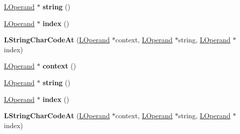 \begin{DoxyCompactItemize}
\item 
\hyperlink{classv8_1_1internal_1_1_l_operand}{L\+Operand} $\ast$ {\bfseries string} ()\hypertarget{classv8_1_1internal_1_1_l_string_char_code_at_a935ea67cb0997a56225d8943bd28acfc}{}\label{classv8_1_1internal_1_1_l_string_char_code_at_a935ea67cb0997a56225d8943bd28acfc}

\item 
\hyperlink{classv8_1_1internal_1_1_l_operand}{L\+Operand} $\ast$ {\bfseries index} ()\hypertarget{classv8_1_1internal_1_1_l_string_char_code_at_a6d34721abedba9af5cdca55a18b388c2}{}\label{classv8_1_1internal_1_1_l_string_char_code_at_a6d34721abedba9af5cdca55a18b388c2}

\item 
{\bfseries L\+String\+Char\+Code\+At} (\hyperlink{classv8_1_1internal_1_1_l_operand}{L\+Operand} $\ast$context, \hyperlink{classv8_1_1internal_1_1_l_operand}{L\+Operand} $\ast$string, \hyperlink{classv8_1_1internal_1_1_l_operand}{L\+Operand} $\ast$index)\hypertarget{classv8_1_1internal_1_1_l_string_char_code_at_a2ea27a024b27a329ff76364ab55c7cd1}{}\label{classv8_1_1internal_1_1_l_string_char_code_at_a2ea27a024b27a329ff76364ab55c7cd1}

\item 
\hyperlink{classv8_1_1internal_1_1_l_operand}{L\+Operand} $\ast$ {\bfseries context} ()\hypertarget{classv8_1_1internal_1_1_l_string_char_code_at_a9482271a8172ce48522512f232ac24aa}{}\label{classv8_1_1internal_1_1_l_string_char_code_at_a9482271a8172ce48522512f232ac24aa}

\item 
\hyperlink{classv8_1_1internal_1_1_l_operand}{L\+Operand} $\ast$ {\bfseries string} ()\hypertarget{classv8_1_1internal_1_1_l_string_char_code_at_a935ea67cb0997a56225d8943bd28acfc}{}\label{classv8_1_1internal_1_1_l_string_char_code_at_a935ea67cb0997a56225d8943bd28acfc}

\item 
\hyperlink{classv8_1_1internal_1_1_l_operand}{L\+Operand} $\ast$ {\bfseries index} ()\hypertarget{classv8_1_1internal_1_1_l_string_char_code_at_a6d34721abedba9af5cdca55a18b388c2}{}\label{classv8_1_1internal_1_1_l_string_char_code_at_a6d34721abedba9af5cdca55a18b388c2}

\item 
{\bfseries L\+String\+Char\+Code\+At} (\hyperlink{classv8_1_1internal_1_1_l_operand}{L\+Operand} $\ast$context, \hyperlink{classv8_1_1internal_1_1_l_operand}{L\+Operand} $\ast$string, \hyperlink{classv8_1_1internal_1_1_l_operand}{L\+Operand} $\ast$index)\hypertarget{classv8_1_1internal_1_1_l_string_char_code_at_a2ea27a024b27a329ff76364ab55c7cd1}{}\label{classv8_1_1internal_1_1_l_string_char_code_at_a2ea27a024b27a329ff76364ab55c7cd1}


\end{DoxyCompactItemize}

